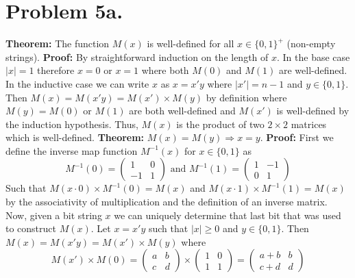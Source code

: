 \documentclass[12pt]{article}
\begin{document}
\pagestyle{plain}
\titleformat{\subsection}[runin]
  {\normalfont\large\bfseries}{\thesubsection}{1em}{}
\titleformat{\subsubsection}[runin]
  {\normalfont\large\bfseries}{\thesubsubsection}{1em}{}

\section*{Problem 5a.}
\textbf{Theorem:} The function $M(x)$ is well-defined for all $x\in\{0,1\}^+$
(non-empty strings).
\newline
\textbf{Proof:} By straightforward induction on the length of $x$. In the base
case $|x| = 1$ therefore $x = 0$ or $x = 1$ where both $M(0)$ and $M(1)$ are
well-defined. In the inductive case we can write $x$ as $x = x'y$ where
$|x'| = n-1$ and $y\in \{0,1\}$. Then $M(x) = M(x'y) = M(x') \times M(y)$ by
definition where $M(y) = M(0) \text{ or } M(1)$ are both well-defined and
$M(x')$ is well-defined by the induction hypothesis. Thus, $M(x)$ is the product
of two $2 \times 2$ matrices which is well-defined.
\vspace{2mm}
\newline
\textbf{Theorem:} $M(x) = M(y) \Rightarrow x = y$.
\newline
\textbf{Proof:} First we define the inverse map function $M^{-1}(x)$ for
$x \in \{0,1\}$ as
$$M^{-1}(0) = \left(\begin{array}{cc} 1 & 0 \\ -1 & 1 \end{array}\right)
\text{ and } M^{-1}(1) = \left(\begin{array}{cc} 1 & -1 \\ 0 & 1 \end{array}\right)$$
Such that $M(x\cdot0)\times M^{-1}(0) = M(x)$ and $M(x\cdot1)\times M^{-1}(1) = M(x)$
by the associativity of multiplication and the definition of an inverse matrix.
Now, given a bit string $x$ we can uniquely determine that last bit that was used
to construct $M(x)$. Let $x = x'y$ such that $|x| \ge 0$ and $y\in\{0,1\}$. Then
$M(x) = M(x'y) = M(x') \times M(y)$ where 
$$M(x') \times M(0) =
\left(\begin{array}{cc} a & b \\ c & d \end{array}\right) \times
\left(\begin{array}{cc} 1 & 0 \\ 1 & 1 \end{array}\right) =
\left(\begin{array}{cc} a+b & b \\ c+d & d \end{array}\right)$$
\end{document}
